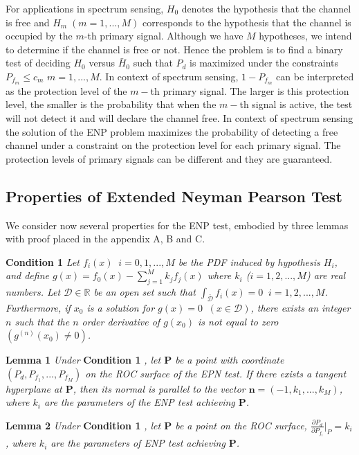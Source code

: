 \documentclass[12pt,journal,a4paper,twoside,onecolumn]{IEEEtran}
\begin{document}
\begin{spacing}{2.5}
For applications in spectrum sensing, $H_0$ denotes the hypothesis that the channel is free and $H_m \;(m=1, ..., M)$ corresponds to the hypothesis that the channel is occupied by the $m$-th primary signal. Although we have $M$ hypotheses, we intend to determine if the channel is free or not. Hence the problem is to find a binary test of deciding $H_0$ versus $\bar{H}_0$ such that $P_d$ is maximized under the constraints $P_{f_m} \leq c_m$ $m = 1, ..., M$. In context of spectrum sensing, $1-P_{f_m}$ can be interpreted as the protection level of the $m-$th primary signal. The larger is this protection level, the smaller is the probability that when the $m-$th signal is active, the test will not detect it and will declare the channel free. In context of spectrum sensing the solution of the ENP problem maximizes the probability of detecting a free channel under a constraint on the protection level for each primary signal. The protection levels of primary signals can be different and they are guaranteed.

\subsection{Properties of Extended Neyman Pearson Test}
We consider now several properties for the ENP test, embodied by three lemmas with proof placed in the appendix A, B and C.

\noindent \textbf{Condition 1}
\textit{
\noindent Let $f_i(x) \;\;i=0, 1, ..., M$ be the PDF induced by hypothesis $H_i$, and define $g(x) = f_0(x) - \sum_{j=1}^{M} k_jf_j(x)$ where $k_i$  ($i = 1, 2, ..., M$) are real numbers. Let $\mathcal{D} \in \mathbb{R}$ be an open set such that $\int_{\bar{\mathcal{D}}}f_i(x)=0\;\;i = 1, 2, ..., M$. Furthermore,  if $x_0$ is a solution  for $g(x) = 0 \;\;(x \in \mathcal{D})$, there exists an integer $n$ such that  the $n$ order derivative of $g(x_0)$ is not equal to zero $(g^{(n)}(x_0) \neq 0)$.
}

\noindent \textbf{Lemma 1}
\textit{
\noindent Under}
\textbf{Condition 1}
\textit{, let $\mathbf{P}$ be a point with coordinate $(P_d, P_{f_1}, ..., P_{f_M})$ on the ROC surface of the EPN test. If there exists a tangent hyperplane at $\mathbf{P}$, then its normal is parallel to the vector $\mathbf{n} = (-1, k_1, ..., k_M)$, where $k_i$ are the parameters of the ENP test achieving $\mathbf{P}$.
}

\noindent \textbf{Lemma 2}
\textit{
\noindent
Under}
\textbf{Condition 1}
\textit{, let $\mathbf{P}$ be a point on the ROC surface, $\frac{\partial P_d}{\partial P_{f_i}} \bigg|_P = k_i$, where $k_i$ are the parameters of ENP test achieving $\mathbf{P}$.
}


\end{spacing}
\end{document}
